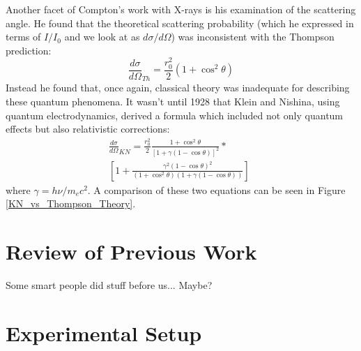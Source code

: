 \documentclass[%
 reprint,
 amsmath,amssymb,
 aps,
 pra,
]{revtex4-1}
\begin{document}
Another facet of Compton's work with X-rays is his examination of the scattering angle. He found that the theoretical scattering probability (which he expressed in terms of $I/I_0$ and we look at as $d\sigma / d\Omega$) was inconsistent with the Thompson prediction:
\begin{equation}\label{eq:thompson}
	\frac{d \sigma}{d \Omega}_{Th} = \frac{r_0^2}{2}(1+\cos^2{\theta})
\end{equation}
Instead he found that, once again, classical theory was inadequate for describing these quantum phenomena. It wasn't until 1928 that Klein and Nishina, using quantum electrodynamics, derived a formula which included not only quantum effects but also relativistic corrections:
\begin{gather}
	\frac{d \sigma}{d \Omega}_{KN} = \frac{r_0^2}{2} \frac{1 + \cos^2{\theta}}{[1 + \gamma(1 - \cos{\theta})]^2} \nonumber * ~~~~~~~~~~~~ \\
	\left[ 1 + \frac{\gamma^2(1 - \cos{\theta})^2}{(1 + \cos^2{\theta})(1+ \gamma(1 - \cos{\theta}))}\right] 
	\label{eq:kn}
\end{gather}
where $\gamma = h\nu / m_e c^2$. A comparison of these two equations can be seen in Figure \ref{KN_vs_Thompson_Theory}.

\section{Review of Previous Work}

Some smart people did stuff before us... Maybe?

\section{Experimental Setup}
\end{document}

